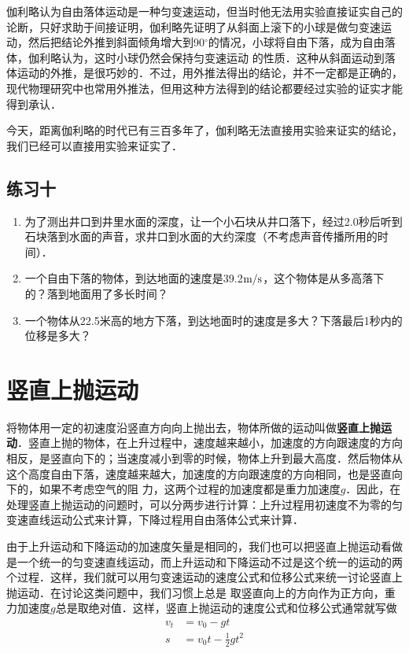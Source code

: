 伽利略认为自由落体运动是一种匀变速运动，但当时他无法用实验直接证实自己的论断，只好求助于间接证明，伽利略先证明了从斜面上滚下的小球是做匀变速运动，然后把结论外推到斜面倾角增大到90$^\circ$的情况，小球将自由下落，成为自由落体，伽利略认为，这时小球仍然会保持匀变速运动
的性质．这种从斜面运动到落体运动的外推，是很巧妙的．不过，用外推法得出的结论，并不一定都是正确的，现代物理研究中也常用外推法，但用这种方法得到的结论都要经过实验的证实才能得到承认．

今天，距离伽利略的时代已有三百多年了，伽利略无法直接用实验来证实的结论，我们已经可以直接用实验来证实了．


\subsection*{练习十}
\begin{enumerate}
	\item 为了测出井口到井里水面的深度，让一个小石块从井口落下，经过2.0秒后听到石块落到水面的声音，求井口到水面的大约深度（不考虑声音传播所用的时间）．
\item 一个自由下落的物体，到达地面的速度是39.2$\text{m}/\text{s}$，这个物体是从多高落下的？落到地面用了多长时间？
\item 一个物体从22.5米高的地方下落，到达地面时的速度是多大？下落最后1秒内的位移是多大？
\end{enumerate}


\section{竖直上抛运动}
将物体用一定的初速度沿竖直方向向上抛出去，物体所做的运动叫做\textbf{竖直上抛运动}．竖直上抛的物体，在上升过程中，速度越来越小，加速度的方向跟速度的方向相反，是竖直向下的；当速度减小到零的时候，物体上升到最大高度．然后物体从这个高度自由下落，速度越来越大，加速度的方向跟速度的方向相同，也是竖直向下的，如果不考虑空气的阻
力，这两个过程的加速度都是重力加速度$g$．因此，在处理竖直上抛运动的问题时，可以分两步进行计算：上升过程用初速度不为零的匀变速直线运动公式来计算，下降过程用自由落体公式来计算．

由于上升运动和下降运动的加速度矢量是相同的，我们也可以把竖直上抛运动看做是一个统一的匀变速直线运动，而上升运动和下降运动不过是这个统一的运动的两个过程．这样，我们就可以用匀变速运动的速度公式和位移公式来统一讨论竖直上抛运动．在讨论这类问题中，我们习惯上总是
取竖直向上的方向作为正方向，重力加速度$g$总是取绝对值．这样，竖直上抛运动的速度公式和位移公式通常就写做
\[\begin{split}
v_t&=v_0-gt\\
s&=v_0 t-\frac{1}{2}gt^2
\end{split}\]

